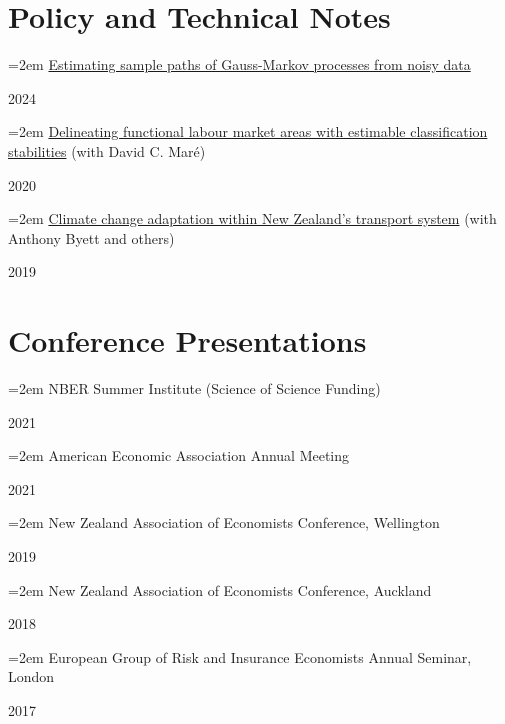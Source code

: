 \documentclass[11pt,oneside]{memoir}
\newcommand{\entry}[2]{\par\parbox[t]{0.9\linewidth}{\strut\raggedright\hangindent=2em #2\strut}\hfill#1}
\begin{document}
	\section{Policy and Technical Notes}
	
		\entry{2024}{\href{https://arxiv.org/abs/2404.00784}{Estimating sample paths of Gauss-Markov processes from noisy data}}
		\entry{2020}{\href{http://ftp.iza.org/dp13642.pdf}{Delineating functional labour market areas with estimable classification stabilities} (with David C. Maré)}
		\entry{2019}{\href{https://motu.nz/assets/Documents/our-work/environment/climate-change-impacts/Transport-Dialogue-Report.pdf}{Climate change adaptation within New Zealand's transport system} (with Anthony Byett and others)}
	
	\section{Conference Presentations}
	
		\entry{2021}{NBER Summer Institute (Science of Science Funding)}
		\entry{2021}{American Economic Association Annual Meeting}
		\entry{2019}{New Zealand Association of Economists Conference, Wellington}
		\entry{2018}{New Zealand Association of Economists Conference, Auckland}
		\entry{2017}{European Group of Risk and Insurance Economists Annual Seminar, London}
\end{document}
